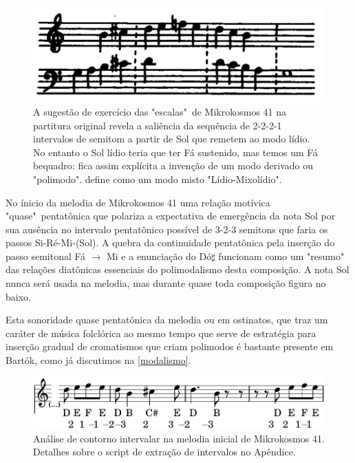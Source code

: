 \documentclass[
	12pt,				%
	openright,			%
	twoside,			%
	a4paper,			%
	english,			%
	french,				%
	spanish,			%
	brazil				%
	]{abntex2}
\begin{document}
\begin{figure}[!h]
	\caption{\label{fig_grafico}A sugestão de exercício das "escalas"\ de Mikrokosmos 41 na partitura original revela a saliência da sequência de 2-2-2-1 intervalos de semitom a partir de Sol que remetem ao modo lídio. No entanto o Sol lídio teria que ter Fá sustenido, mas temos um Fá bequadro: fica assim explícita a invenção de um modo derivado ou "polimodo".  define como um modo misto "Lídio-Mixolídio". } 
	\begin{center}
	    \includegraphics[scale=0.3]{estudosM21/mikro041_exercicio.png}
	\end{center}
\end{figure}


No ínicio da melodia de Mikrokosmos 41 uma relação motívica "quase"\ pentatônica que polariza a expectativa de emergência da nota Sol por sua ausência no intervalo pentatônico possível de 3-2-3 semitons que faria os passos Si-Ré-Mi-(Sol). A quebra da continuidade pentatônica pela inserção do passo semitonal Fá $ \rightarrow $ Mi e a enunciação do Dó$\sharp$ funcionam como um "resumo" das relações diatônicas essenciais do polimodalismo desta composição. A nota Sol nunca será usada na melodia, mas durante quase toda composição figura no baixo.

Esta sonoridade quase pentatônica da melodia ou em ostinatos, que traz um caráter de música folclórica ao mesmo tempo que serve de estratégia para inserção gradual de cromatismos que criam polimodos é bastante presente em Bartók, como já discutimos na \autoref{modalismo}.

\begin{figure}[!h]
	\caption{\label{fig_grafico} Análise de contorno intervalar na melodia inicial de Mikrokosmos 41. Detalhes sobre o script de extração de intervalos no Apêndice.  } 
	\begin{center}
	    \includegraphics[scale=0.3]{estudosM21/mikro041_contorno01.png}
	\end{center}
\end{figure}
\end{document}
